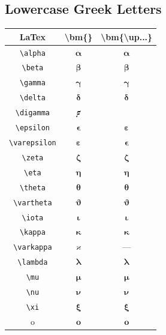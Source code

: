 \documentclass[12pt,a4paper]{article}
\begin{document}
\newpage

\subsection*{Lowercase Greek Letters}

\begin{longtable}{|c|c|c|}
\hline
\textbf{LaTex} & \textbf{\textbackslash{}bm\{\}} & \textbf{\textbackslash{}bm\{\textbackslash{}up...\}} \\
\hline
\verb|\alpha| & $\bm{\alpha}$ & $\bm{\upalpha}$ \\ %
\verb|\beta| & $\bm{\beta}$ & $\bm{\upbeta}$ \\ %
\verb|\gamma| & $\bm{\gamma}$ & $\bm{\upgamma}$ \\ %
\verb|\delta| & $\bm{\delta}$ & $\bm{\updelta}$ \\ %
\verb|\digamma| & $\bm{\digamma}$ &\\ %
\verb|\epsilon| & $\bm{\epsilon}$ & $\bm{\upepsilon}$ \\ %
\verb|\varepsilon| & $\bm{\varepsilon}$ & $\bm{\upvarepsilon}$ \\ %
\verb|\zeta| & $\bm{\zeta}$ & $\bm{\upzeta}$ \\ %
\verb|\eta| & $\bm{\eta}$ & $\bm{\upeta}$ \\ %
\verb|\theta| & $\bm{\theta}$ & $\bm{\uptheta}$ \\ %
\verb|\vartheta| & $\bm{\vartheta}$ & $\bm{\upvartheta}$ \\ %
\verb|\iota| & $\bm{\iota}$ & $\bm{\upiota}$ \\ %
\verb|\kappa| & $\bm{\kappa}$ & $\bm{\upkappa}$ \\ %
\verb|\varkappa| & $\bm{\varkappa}$ & --- \\ %
\verb|\lambda| & $\bm{\lambda}$ & $\bm{\uplambda}$ \\ %
\verb|\mu| & $\bm{\mu}$ & $\bm{\upmu}$ \\ %
\verb|\nu| & $\bm{\nu}$ & $\bm{\upnu}$ \\ %
\verb|\xi| & $\bm{\xi}$ & $\bm{\upxi}$ \\ %
o & $\bm{o}$ & $\mathbf{o}$ \\ %

\end{longtable}
\end{document}
